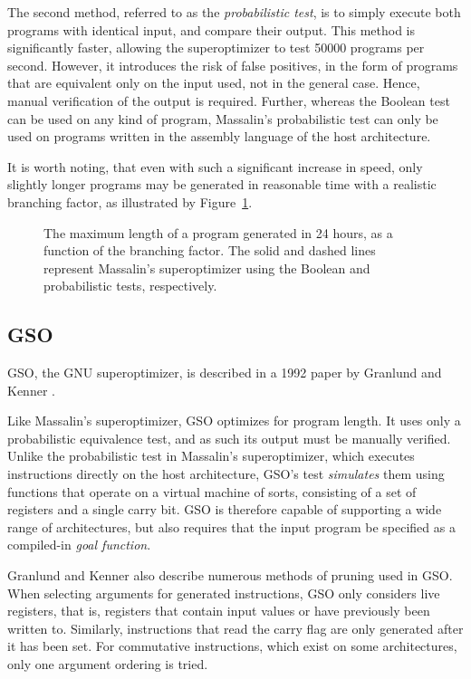 \documentclass[a4paper,11pt]{kth-mag}
\begin{document}
The second method, referred to as the \emph{probabilistic test}, is to simply execute both programs with identical input, and compare their output.
This method is significantly faster, allowing the superoptimizer to test 50000 programs per second.
However, it introduces the risk of false positives, in the form of programs that are equivalent only on the input used, not in the general case.
Hence, manual verification of the output is required.
Further, whereas the Boolean test can be used on any kind of program, Massalin's probabilistic test can only be used on programs written in the assembly language of the host architecture.


It is worth noting, that even with such a significant increase in speed, only slightly longer programs may be generated in reasonable time with a realistic branching factor, as illustrated by Figure~\ref{fig:so_program_length}.

\begin{figure}
\centering

\caption{The maximum length of a program generated in 24 hours, as a function of the branching factor. %
The solid and dashed lines represent Massalin's superoptimizer using the Boolean and probabilistic tests, respectively.}
\label{fig:so_program_length}
\end{figure}

\subsection{GSO}

GSO, the GNU superoptimizer, is described in a 1992 paper by Granlund and Kenner \cite{granlund92}.

Like Massalin's superoptimizer, GSO optimizes for program length.
It uses only a probabilistic equivalence test, and as such its output must be manually verified.
Unlike the probabilistic test in Massalin's superoptimizer, which executes instructions directly on the host architecture, GSO's test \emph{simulates} them using functions that operate on a virtual machine of sorts, consisting of a set of registers and a single carry bit.
GSO is therefore capable of supporting a wide range of architectures, but also requires that the input program be specified as a compiled-in \emph{goal function}.

Granlund and Kenner also describe numerous methods of pruning used in GSO.
When selecting arguments for generated instructions, GSO only considers live registers, that is, registers that contain input values or have previously been written to.
Similarly, instructions that read the carry flag are only generated after it has been set.
For commutative instructions, which exist on some architectures, only one argument ordering is tried.
\end{document}
